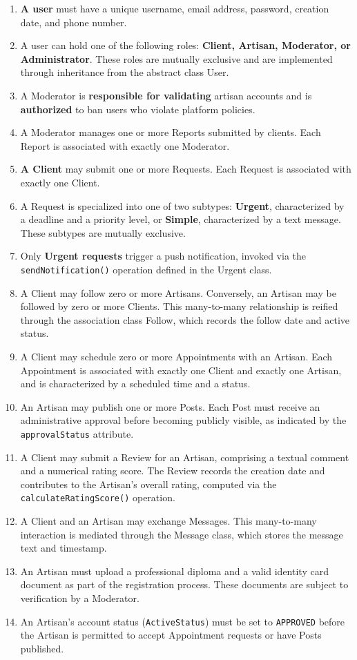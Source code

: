\documentclass[12pt,a4paper]{report}
\begin{document}
\begin{enumerate}
    \item \textbf{A user} must have a unique username, email address, password, creation date, and phone number.
    \item A user can hold one of the following roles: \textbf{Client, Artisan, Moderator, or Administrator}. These roles are mutually exclusive and are implemented through inheritance from the abstract class User.
    \item A Moderator is \textbf{responsible for validating }artisan accounts and is \textbf{authorized} to ban users who violate platform policies.
    \item A Moderator manages one or more Reports submitted by clients. Each Report is associated with exactly one Moderator.
    \item \textbf{A Client} may submit one or more Requests. Each Request is associated with exactly one Client.
    \item A Request is specialized into one of two subtypes: \textbf{Urgent}, characterized by a deadline and a priority level, or \textbf{Simple}, characterized by a text message. These subtypes are mutually exclusive.
    \item Only \textbf{Urgent requests} trigger a push notification, invoked via the \texttt{sendNotification()} operation defined in the Urgent class.
    \item A Client may follow zero or more Artisans. Conversely, an Artisan may be followed by zero or more Clients. This many-to-many relationship is reified through the association class Follow, which records the follow date and active status.
    \item A Client may schedule zero or more Appointments with an Artisan. Each Appointment is associated with exactly one Client and exactly one Artisan, and is characterized by a scheduled time and a status.
    \item An Artisan may publish one or more Posts. Each Post must receive an administrative approval before becoming publicly visible, as indicated by the \texttt{approvalStatus} attribute.
    \item A Client may submit a Review for an Artisan, comprising a textual comment and a numerical rating score. The Review records the creation date and contributes to the Artisan's overall rating, computed via the \texttt{calculateRatingScore()} operation.
    \item A Client and an Artisan may exchange Messages. This many-to-many interaction is mediated through the Message class, which stores the message text and timestamp.
    \item An Artisan must upload a professional diploma and a valid identity card document as part of the registration process. These documents are subject to verification by a Moderator.
    \item An Artisan's account status (\texttt{ActiveStatus}) must be set to \texttt{APPROVED} before the Artisan is permitted to accept Appointment requests or have Posts published.
\end{enumerate}
\end{document}
